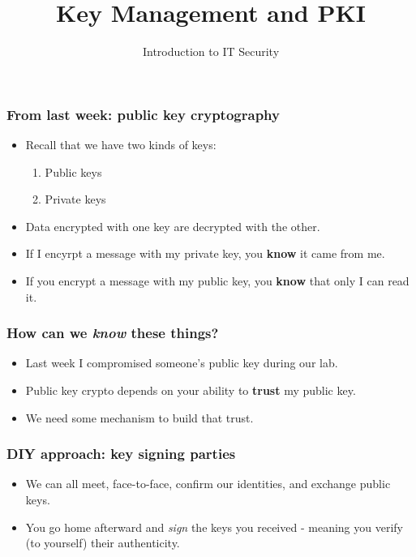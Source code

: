 \documentclass[10pt]{beamer}
\title{Key Management and PKI}
\author[IN618]{Introduction to IT Security}
\institute[Otago Polytechnic]{
  Otago Polytechnic \\
  Dunedin, New Zealand \\
}
\date{}
\begin{document}
\begin{frame}[plain]
  \titlepage
\end{frame}


\begin{frame}
  \frametitle{From last week: public key cryptography}

 \begin{itemize}
  \item Recall that we have two kinds of keys:
    \begin{enumerate}
      \item Public keys
      \item Private keys
    \end{enumerate}
  \item Data encrypted with one key are decrypted with the other.
  \item If I encyrpt a message with my private key, you \textbf{know} it came from me.
  \item If you encrypt a message with my public key, you \textbf{know} that only I can read it.
  \end{itemize}
\end{frame}


\begin{frame}
  \frametitle{How can we \emph{know} these things?}

 \begin{itemize}
  \item Last week I compromised someone's public key during our lab.
  \item Public key crypto depends on your ability to \textbf{trust} my public key.
  \item We need some mechanism to build that trust.
  \end{itemize}
\end{frame}


\begin{frame}
  \frametitle{DIY approach:  key signing parties}

 \begin{itemize}
  \item We can all meet, face-to-face, confirm our identities, and exchange public keys.
  \item You go home afterward and \emph{sign} the keys you received - meaning you verify (to yourself) their authenticity.
  \end{itemize}
\end{frame}
\end{document}
